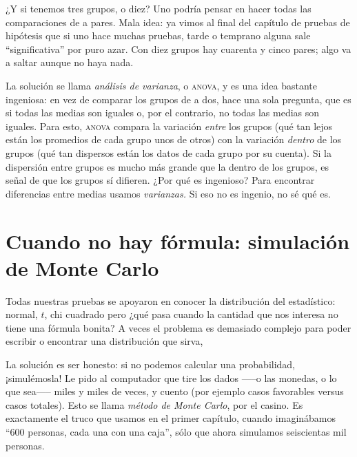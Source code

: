 ¿Y si tenemos tres grupos, o diez? Uno podría pensar en hacer todas las comparaciones de a pares. Mala idea: ya vimos al final del capítulo de pruebas de hipótesis que si uno hace muchas pruebas, tarde o temprano alguna sale \enquote{significativa} por puro azar. Con diez grupos hay cuarenta y cinco pares; algo va a saltar aunque no haya nada.

La solución se llama \emph{análisis de varianza}, o \textsc{anova}, y es una idea bastante ingeniosa: en vez de comparar los grupos de a dos, hace una sola pregunta, que es si todas las medias son iguales o, por el contrario, no todas las medias son iguales. Para esto, \textsc{anova} compara la variación \emph{entre} los grupos (qué tan lejos están los promedios de cada grupo unos de otros) con la variación \emph{dentro} de los grupos (qué tan dispersos están los datos de cada grupo por su cuenta). Si la dispersión entre grupos es mucho más grande que la dentro de los grupos, es señal de que los grupos sí difieren. ¿Por qué es ingenioso? Para encontrar diferencias entre medias usamos \emph{varianzas.} Si eso no es ingenio, no sé qué es.

\section{Cuando no hay fórmula: simulación de Monte Carlo}

Todas nuestras pruebas se apoyaron en conocer la distribución del estadístico: normal, \(t\), chi cuadrado pero ¿qué pasa cuando la cantidad que nos interesa no tiene una fórmula bonita? A veces el problema es demasiado complejo para poder escribir o encontrar una distribución que sirva,

La solución es ser honesto: si no podemos calcular una probabilidad, ¡simulémosla! Le pido al computador que tire los dados —--o las monedas, o lo que sea—-- miles y miles de veces, y cuento (por ejemplo casos favorables versus casos totales). Esto se llama \emph{método de Monte Carlo}, por el casino. Es exactamente el truco que usamos en el primer capítulo, cuando imaginábamos \enquote{600 personas, cada una con una caja}, sólo que ahora simulamos seiscientas mil personas.

